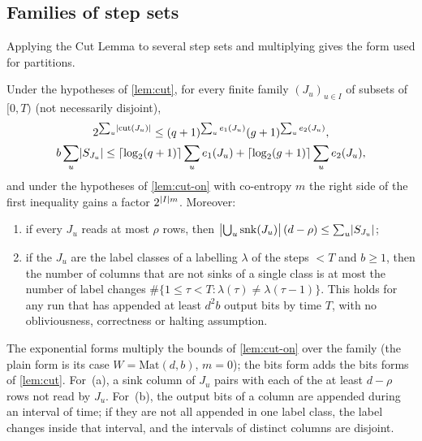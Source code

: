 \subsection{Families of step sets}

Applying the Cut Lemma to several step sets and multiplying gives the form used for partitions.

\begin{corollary}\label{cor:cut-family}
Under the hypotheses of \cref{lem:cut}, for every finite family $(J_u)_{u\in I}$ of subsets of
$[0,T)$ (not necessarily disjoint),
\begin{gather*}
  2^{\sum_u\lvert \mathrm{cut}(J_u) \rvert}\le(q+1)^{\sum_ue_1(J_u)}(g+1)^{\sum_ue_2(J_u)},\\
  b\sum_{u}\lvert S_{J_u} \rvert\le\lceil \log_2 (q+1) \rceil\sum_ue_1(J_u)+\lceil \log_2 (g+1) \rceil\sum_ue_2(J_u),
\end{gather*}
and under the hypotheses of \cref{lem:cut-on} with co-entropy $m$ the right side of the first
inequality gains a factor $2^{\lvert I \rvert m}$. Moreover:
\begin{enumerate}[label=(\alph*)]
\item if every $J_u$ reads at most $\rho$ rows, then
$\bigl|\bigcup_u\mathrm{snk}(J_u)\bigr|\,(d-\rho)\le\sum_u\lvert S_{J_u} \rvert$;
\item if the $J_u$ are the label classes of a labelling $\lambda$ of the steps $<T$ and $b\ge1$,
then the number of columns that are not sinks of a single class is at most the number of label
changes $\#\{1\le\tau<T:\lambda(\tau)\ne\lambda(\tau-1)\}$. This holds for any run that has
appended at least $d^2b$ output bits by time $T$, with no obliviousness, correctness or halting
assumption.
\end{enumerate}
\end{corollary}

\begin{outline}
The exponential forms multiply the bounds of \cref{lem:cut-on} over the family (the plain form is
its case $W=\mathrm{Mat}(d,b)$, $m=0$); the bits form adds the bits forms of \cref{lem:cut}. For~(a), a sink
column of $J_u$ pairs with each of the at least $d-\rho$ rows not read by $J_u$. For~(b), the
output bits of a column are appended during an interval of time; if they are not all appended in
one label class, the label changes inside that interval, and the intervals of distinct columns
are disjoint.
\end{outline}
